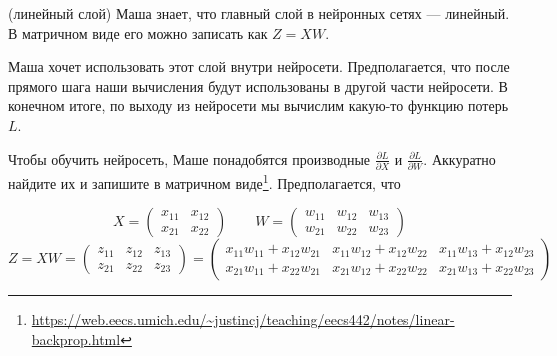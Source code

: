 \begin{problem}{(линейный слой)}
Маша знает, что главный слой в нейронных сетях --- линейный. В матричном виде его можно записать как $Z = XW.$ 

Маша хочет использовать этот слой внутри нейросети. Предполагается, что после прямого шага наши вычисления будут использованы в другой части нейросети. В конечном итоге, по выходу из нейросети мы вычислим какую-то функцию потерь $L$. 

Чтобы обучить нейросеть, Маше понадобятся производные $\frac{\partial L}{\partial X}$ и $\frac{\partial L}{\partial W}.$  Аккуратно найдите их и запишите в матричном виде\footnote{\url{https://web.eecs.umich.edu/~justincj/teaching/eecs442/notes/linear-backprop.html}}. Предполагается, что 

\[ 
    X = \begin{pmatrix} x_{11} & x_{12} \\  x_{21} & x_{22}  \end{pmatrix} \qquad W  = \begin{pmatrix} w_{11} & w_{12} & w_{13} \\ w_{21} & w_{22} & w_{23}  \end{pmatrix} 
\]\[
	Z = XW = \begin{pmatrix} z_{11} & z_{12} & z_{13}\\  z_{21} & z_{22} & z_{23}  \end{pmatrix} = \begin{pmatrix} x_{11}w_{11} + x_{12}w_{21} & x_{11}w_{12} + x_{12}w_{22} & x_{11}w_{13} + x_{12}w_{23} \\ x_{21}w_{11} + x_{22}w_{21} & x_{21}w_{12} + x_{22}w_{22} & x_{21}w_{13} + x_{22}w_{23} \end{pmatrix}
\]

\end{problem}

